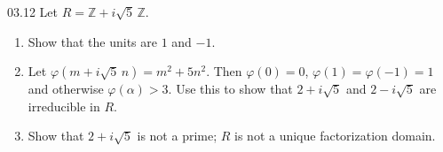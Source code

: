 \documentclass[11pt]{article}
\begin{document}
\begin{problem}{03.12}
  Let $R = \mathbb{Z} + i\sqrt{5}\,\mathbb{Z}$.
  \begin{enumerate}
    \item Show that the units are $1$ and $-1$.
    \item Let $\varphi(m + i\sqrt{5}\,n) = m^{2} + 5n^{2}$. Then
      $\varphi(0) = 0$, $\varphi(1) = \varphi(-1) = 1$ and otherwise
      $\varphi(\alpha) > 3$. Use this to show that $2 + i\sqrt{5}$ and
      $2 - i\sqrt{5}$ are irreducible in $R$.
    \item Show that $2 + i\sqrt{5}$ is not a prime; $R$ is not a unique
      factorization domain.
  \end{enumerate}
\end{problem}
\end{document}
